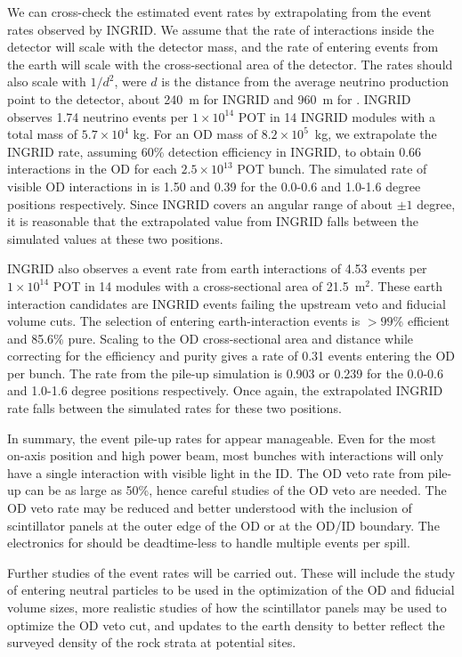 We can cross-check the estimated \nuprism event rates by extrapolating from the event rates observed by INGRID.  We assume that
the rate of interactions inside the detector will scale with the detector mass, and the rate of entering events from the earth
will scale with the cross-sectional area of the detector.  The rates should also scale with $1/d^{2}$, were $d$ is the
distance from the average neutrino production point to the detector, about 240~m for INGRID and 960~m for \nuprism. 
INGRID observes 1.74 neutrino events per $1\times10^{14}$ POT in 14 INGRID modules with a total mass of $5.7\times10^4$ kg.  For an OD mass
of $8.2\times10^5$~kg, we extrapolate the INGRID rate, assuming 60\% detection efficiency in INGRID, to obtain 0.66 interactions 
in the OD for each $2.5\times10^{13}$ POT bunch.  The simulated rate of visible OD interactions in \nuprismlite is 1.50 and 0.39 for
the 0.0-0.6 and 1.0-1.6 degree positions respectively.  Since INGRID covers an angular range of about $\pm1$ degree, it is
reasonable that the extrapolated value from INGRID falls between the simulated \nuprismlite values at these two positions.

INGRID also observes a event rate from earth interactions of 4.53 events per $1\times10^{14}$ POT in 14 modules with a cross-sectional area
of 21.5~m$^{2}$.  These earth interaction candidates are INGRID events failing the upstream veto and fiducial volume cuts.  The selection
of entering earth-interaction events is $>99$\% efficient and 85.6\% pure.  Scaling to the OD cross-sectional area and
distance while
correcting for the efficiency and purity gives a rate of 0.31 events entering the OD per bunch.  The rate from
the \nuprism pile-up simulation is 0.903 or 0.239 for the 0.0-0.6 and 1.0-1.6 degree positions respectively.  Once again, the extrapolated
INGRID rate falls between the simulated rates for these two \nuprismlite positions.

In summary, the event pile-up rates for \nuprism appear manageable.  Even for the most on-axis position and high power beam, most bunches
with interactions will only have a single interaction with visible light in the ID.  The OD veto rate from pile-up can be as large as 50\%,
hence careful studies of the OD veto are needed.
The OD veto rate may be reduced and better understood with the inclusion of scintillator panels at the outer edge of the OD or at the OD/ID 
boundary.  The electronics for \nuprismlite should be deadtime-less to handle multiple events per spill.  

Further studies of the event rates will be carried out.  These will include the study of entering neutral particles to be used
in the optimization of the OD and fiducial volume sizes, more realistic studies of how the scintillator panels may be used to
optimize the OD veto cut, and updates to the earth density to better reflect the surveyed density of the rock strata at potential \nuprism sites.  

 
